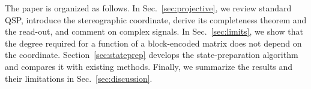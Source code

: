 The paper is organized as follows.  In Sec.~\ref{sec:projective},
we review standard QSP, introduce the stereographic coordinate,
derive its completeness theorem and the read-out, and comment
on complex signals.  In
Sec.~\ref{sec:limits}, we show that the degree required for a
function of a block-encoded matrix does not depend on the
coordinate.
Section~\ref{sec:stateprep} develops the state-preparation
algorithm and compares it with existing methods.  Finally, we
summarize the results and their limitations in
Sec.~\ref{sec:discussion}.
